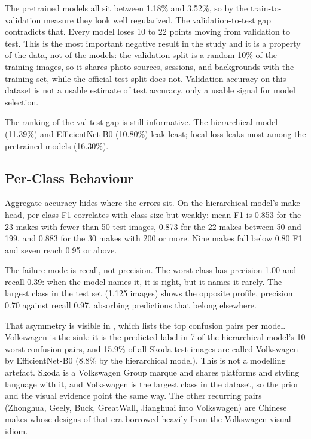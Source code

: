 The pretrained models all sit between 1.18\% and 3.52\%, so by the train-to-validation measure they look well regularized. The validation-to-test gap contradicts that. Every model loses 10 to 22 points moving from validation to test. This is the most important negative result in the study and it is a property of the data, not of the models: the validation split is a random 10\% of the training images, so it shares photo sources, sessions, and backgrounds with the training set, while the official test split does not. Validation accuracy on this dataset is not a usable estimate of test accuracy, only a usable signal for model selection.

The ranking of the val-test gap is still informative. The hierarchical model (11.39\%) and EfficientNet-B0 (10.80\%) leak least; focal loss leaks most among the pretrained models (16.30\%).

\subsection{Per-Class Behaviour}

Aggregate accuracy hides where the errors sit. On the hierarchical model's make head, per-class F1 correlates with class size but weakly: mean F1 is 0.853 for the 23 makes with fewer than 50 test images, 0.873 for the 22 makes between 50 and 199, and 0.883 for the 30 makes with 200 or more. Nine makes fall below 0.80 F1 and seven reach 0.95 or above.

The failure mode is recall, not precision. The worst class has precision 1.00 and recall 0.39: when the model names it, it is right, but it names it rarely. The largest class in the test set (1,125 images) shows the opposite profile, precision 0.70 against recall 0.97, absorbing predictions that belong elsewhere.

That asymmetry is visible in , which lists the top confusion pairs per model. Volkswagen is the sink: it is the predicted label in 7 of the hierarchical model's 10 worst confusion pairs, and 15.9\% of all Skoda test images are called Volkswagen by EfficientNet-B0 (8.8\% by the hierarchical model). This is not a modelling artefact. Skoda is a Volkswagen Group marque and shares platforms and styling language with it, and Volkswagen is the largest class in the dataset, so the prior and the visual evidence point the same way. The other recurring pairs (Zhonghua, Geely, Buck, GreatWall, Jianghuai into Volkswagen) are Chinese makes whose designs of that era borrowed heavily from the Volkswagen visual idiom.

